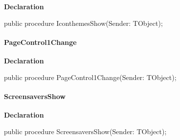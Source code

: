 \documentclass{report}
\newif\ifpdf
\begin{document}
\label{thinstall.TisFrm-IconthemesShow}
\begin{list}{}{
\setlength{\itemindent}{0cm}
\setlength{\listparindent}{0cm}
\setlength{\leftmargin}{\evensidemargin}
\addtolength{\leftmargin}{\tmplength}
\settowidth{\labelsep}{X}
\addtolength{\leftmargin}{\labelsep}
\setlength{\labelwidth}{\tmplength}
}
\item[\textbf{Declaration}\hfill]
\ifpdf
\begin{flushleft}
\fi
\begin{ttfamily}
public procedure IconthemesShow(Sender: TObject);\end{ttfamily}

\ifpdf
\end{flushleft}
\fi

\end{list}
\paragraph*{PageControl1Change}\hspace*{\fill}

\label{thinstall.TisFrm-PageControl1Change}
\begin{list}{}{
\setlength{\itemindent}{0cm}
\setlength{\listparindent}{0cm}
\setlength{\leftmargin}{\evensidemargin}
\addtolength{\leftmargin}{\tmplength}
\settowidth{\labelsep}{X}
\addtolength{\leftmargin}{\labelsep}
\setlength{\labelwidth}{\tmplength}
}
\item[\textbf{Declaration}\hfill]
\ifpdf
\begin{flushleft}
\fi
\begin{ttfamily}
public procedure PageControl1Change(Sender: TObject);\end{ttfamily}

\ifpdf
\end{flushleft}
\fi

\end{list}
\paragraph*{ScreensaversShow}\hspace*{\fill}

\label{thinstall.TisFrm-ScreensaversShow}
\begin{list}{}{
\setlength{\itemindent}{0cm}
\setlength{\listparindent}{0cm}
\setlength{\leftmargin}{\evensidemargin}
\addtolength{\leftmargin}{\tmplength}
\settowidth{\labelsep}{X}
\addtolength{\leftmargin}{\labelsep}
\setlength{\labelwidth}{\tmplength}
}
\item[\textbf{Declaration}\hfill]
\ifpdf
\begin{flushleft}
\fi
\begin{ttfamily}
public procedure ScreensaversShow(Sender: TObject);\end{ttfamily}

\ifpdf
\end{flushleft}
\fi

\end{list}
\end{document}
